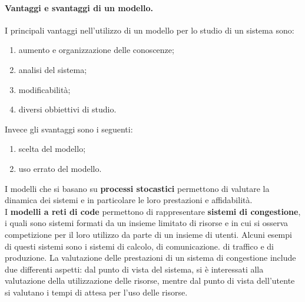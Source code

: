 \paragraph{Vantaggi e svantaggi di un modello.}
I principali vantaggi nell'utilizzo di un modello per lo studio di un sistema sono:
\begin{enumerate}
    \item aumento e organizzazione delle conoscenze;
    \item analisi del sistema;
    \item modificabilità;
    \item diversi obbiettivi di studio.
\end{enumerate}
Invece gli svantaggi sono i seguenti:
\begin{enumerate}
    \item scelta del modello;
    \item uso errato del modello.
\end{enumerate}
 I modelli  che si basano su \textbf{processi stocastici} permettono di valutare la dinamica dei sistemi e in particolare le loro prestazioni e affidabilità. \\
 I \textbf{modelli a reti di code} permettono di rappresentare \textbf{sistemi di congestione}, i quali sono sistemi formati da un insieme limitato di risorse e in cui si osserva competizione per il loro utilizzo da parte di un insieme di utenti. Alcuni esempi di questi sistemi sono i sistemi di calcolo, di comunicazione. di traffico e di produzione. La valutazione delle prestazioni di un sistema di congestione include due differenti aspetti: dal punto di vista del sistema, si è interessati alla valutazione della utilizzazione delle risorse, mentre dal punto di vista dell’utente si valutano i tempi di attesa per l’uso delle risorse.
 
